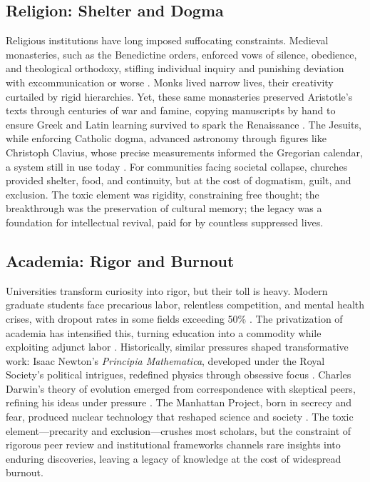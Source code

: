 \documentclass[12pt]{article}
\begin{document}
\subsection{Religion: Shelter and Dogma}
Religious institutions have long imposed suffocating constraints. Medieval monasteries, such as the Benedictine orders, enforced vows of silence, obedience, and theological orthodoxy, stifling individual inquiry and punishing deviation with excommunication or worse \citep{hadot1995philosophy}. Monks lived narrow lives, their creativity curtailed by rigid hierarchies. Yet, these same monasteries preserved Aristotle’s texts through centuries of war and famine, copying manuscripts by hand to ensure Greek and Latin learning survived to spark the Renaissance \citep{koyre1957closed}. The Jesuits, while enforcing Catholic dogma, advanced astronomy through figures like Christoph Clavius, whose precise measurements informed the Gregorian calendar, a system still in use today \citep{koyre1957closed}. For communities facing societal collapse, churches provided shelter, food, and continuity, but at the cost of dogmatism, guilt, and exclusion. The toxic element was rigidity, constraining free thought; the breakthrough was the preservation of cultural memory; the legacy was a foundation for intellectual revival, paid for by countless suppressed lives.

\subsection{Academia: Rigor and Burnout}
Universities transform curiosity into rigor, but their toll is heavy. Modern graduate students face precarious labor, relentless competition, and mental health crises, with dropout rates in some fields exceeding 50\% \citep{mirowski2011science}. The privatization of academia has intensified this, turning education into a commodity while exploiting adjunct labor \citep{graeber2018bullshit}. Historically, similar pressures shaped transformative work: Isaac Newton’s \textit{Principia Mathematica}, developed under the Royal Society’s political intrigues, redefined physics through obsessive focus \citep{koyre1957closed}. Charles Darwin’s theory of evolution emerged from correspondence with skeptical peers, refining his ideas under pressure \citep{koyre1957closed}. The Manhattan Project, born in secrecy and fear, produced nuclear technology that reshaped science and society \citep{mirowski2011science}. The toxic element—precarity and exclusion—crushes most scholars, but the constraint of rigorous peer review and institutional frameworks channels rare insights into enduring discoveries, leaving a legacy of knowledge at the cost of widespread burnout.
\end{document}

